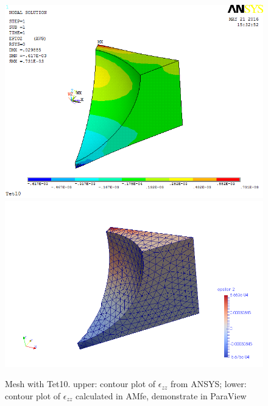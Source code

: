 \begin{figure}[htbp]
	\begin{center}
		\includegraphics[width=13cm,clip]{Tet10_Ezz.png} 		
		\includegraphics[width=13cm,clip]{Tet10_Ezz_P.png} 		
		\caption{Mesh with Tet10. upper: contour plot of $\epsilon_{zz}$ from ANSYS; lower: contour plot of $\epsilon_{zz}$ calculated in AMfe, demonstrate in ParaView} \label{fig: Tet10_Ezz}
	\end{center}
\end{figure}

